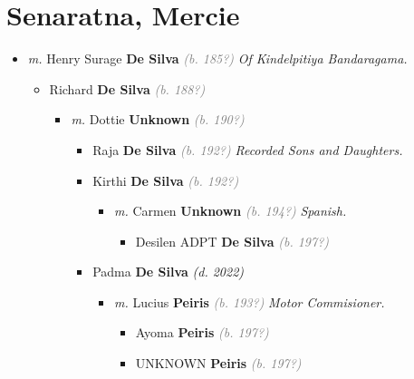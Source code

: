 \documentclass[10pt, openany]{book}
\begin{document}
\chapter{Senaratna, Mercie}
\label{00000750}
\textcolor{slmaroon}{\textit{}}
\begin{itemize}
\item{\textit{m.} Henry Surage \textbf{De Silva} \textcolor{gray}{\textit{(b. 185?)}} \textcolor{slmaroon}{\textit{Of Kindelpitiya Bandaragama.}}   \label{couple:00000146:00000750} \begin{itemize}
\item{Richard \textbf{De Silva} \textcolor{gray}{\textit{(b. 188?)}}
\begin{itemize}
\item{\textit{m.} Dottie \textbf{Unknown} \textcolor{gray}{\textit{(b. 190?)}}   \label{couple:00000163:00000874} \begin{itemize}
\item{Raja \textbf{De Silva} \textcolor{gray}{\textit{(b. 192?)}} \textcolor{slmaroon}{\textit{Recorded Sons and Daughters.}}
  }
\item{Kirthi \textbf{De Silva} \textcolor{gray}{\textit{(b. 192?)}}
\begin{itemize}
\item{\textit{m.} Carmen \textbf{Unknown} \textcolor{gray}{\textit{(b. 194?)}} \textcolor{slmaroon}{\textit{Spanish.}}   \label{couple:00000152:00000862} \begin{itemize}
\item{Desilen ADPT \textbf{De Silva} \textcolor{gray}{\textit{(b. 197?)}}
   }
\end{itemize}}
\end{itemize}
  }
\item{Padma \textbf{De Silva} \textcolor{slorange}{\textit{(d. 2022)}}
\begin{itemize}
\item{\textit{m.} Lucius \textbf{Peiris} \textcolor{gray}{\textit{(b. 193?)}} \textcolor{slmaroon}{\textit{Motor Commisioner.}}   \label{couple:00000160:00000589} \begin{itemize}
\item{Ayoma \textbf{Peiris} \textcolor{gray}{\textit{(b. 197?)}}
 }
\item{UNKNOWN \textbf{Peiris} \textcolor{gray}{\textit{(b. 197?)}}
 }
\end{itemize}}

\end{itemize}}
\end{itemize}}
\end{itemize}}
\end{itemize}}
\end{itemize}
\end{document}

